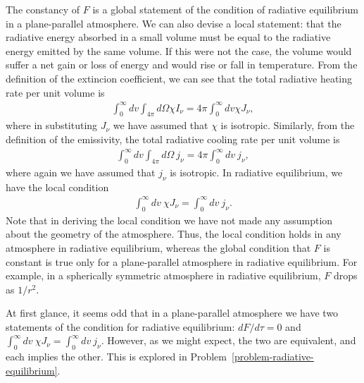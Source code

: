 The constancy of $F$ is a global statement of the condition of radiative
equilibrium in a plane-parallel atmosphere. We can also devise a local
statement: that the radiative energy absorbed in a small volume must be
equal to the radiative energy emitted by the same volume. If this were
not the case, the volume would suffer a net gain or loss of energy and
would rise or fall in temperature. From the definition of the extincion
coefficient, we can see that the total radiative heating rate per unit
volume is
\begin{align}
\int_0^\infty\!\!\!dv
\int_{4\pi}\!\!\!d\Omega
\chi I_\nu
=
4\pi
\int_0^\infty\!\!\!dv
\chi J_\nu,
\end{align}
where in substituting $J_\nu$ we have assumed that $\chi$ is
isotropic. Similarly, from the definition of the emissivity, the total
radiative cooling rate per unit volume is
\begin{align}
\int_0^\infty\!\!\!dv
\int_{4\pi}\!\!\!d\Omega\:
j_\nu = 4\pi \int_0^\infty\!\!\!dv\: j_\nu,
\end{align}
where again we have assumed that $j_\nu$ is isotropic.
In radiative equilibrium, we have the local condition
\begin{align}
\int_0^\infty\!\!\!dv\:
\chi J_\nu
=
\int_0^\infty\!\!\!dv\: j_\nu.
\end{align}
Note that in deriving the local condition we have not made any
assumption about the geometry of the atmosphere. Thus, the local
condition holds in any atmosphere in radiative equilibrium, whereas the
global condition that $F$ is constant is true only for a plane-parallel
atmosphere in radiative equilibrium. For example, in a spherically
symmetric atmosphere in radiative equilibrium, $F$ drops as $1/r^2$.

At first glance, it seems odd that in a plane-parallel atmosphere we
have two statements of the condition for radiative equilibrium:
$dF/d\tau = 0$ and $\int_0^\infty\!\!\!dv\:
\chi J_\nu
=\int_0^\infty\!\!\!dv\: j_\nu$. However, as we might expect, the
two are equivalent, and each implies the other. This is explored in
Problem~\ref{problem-radiative-equilibrium}.
